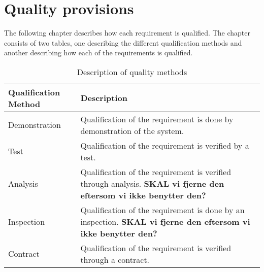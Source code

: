 \chapter{Quality provisions}
The following chapter describes how each requirement is qualified. The chapter consists of two tables, one describing the different qualification methods and another describing how each of the requirements is qualified.\\



\begin{table}[H]
\begin{tabular}{|l|l|}
\hline
 \textbf{Qualification Method} & \textbf{Description} \\ \hline
 Demonstration & Qualification of the requirement is done by demonstration of the system. \\  \hline
 Test & Qualification of the requirement is verified by a test. \\  \hline
 Analysis & Qualification of the requirement is verified through analysis. \textbf{SKAL vi fjerne den eftersom vi ikke benytter den?} \\  \hline
 Inspection & Qualification of the requirement is done by an inspection. \textbf{SKAL vi fjerne den eftersom vi ikke benytter den?} \\  \hline
 Contract & Qualification of the requirement is verified through a contract. \\ \hline
\end{tabular}
\caption{Description of quality methods}
\end{table}


\enspace


